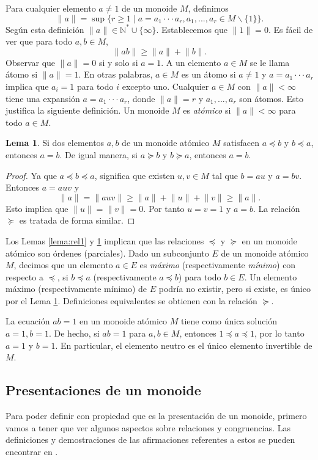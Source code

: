 \documentclass[12pt]{book}
\theoremstyle{definition}
\newtheorem{lema}{Lema}[section]
\providecommand{\norm}[1]{\lVert#1\rVert}
\begin{document}
Para cualquier elemento $a\neq 1$ de un monoide $M$, definimos
$$\norm{a}=\sup\{r\geq 1\mid a=a_1\cdot\cdot\cdot a_r,a_1,...,a_r\in M\backslash \{1\}\}.$$
Según esta definición $\norm{a}\in \mathbb{N}^*\cup\{\infty\}$. Establecemos que $\norm{1}=0$. Es fácil de ver que para todo $a,b\in M$,
$$\norm{ab}\geq\norm{a}+\norm{b}.$$
Observar que $\norm{a}=0$ si y solo si $a=1$. A un elemento $a\in M$ se le llama átomo si $\norm{a}=1$. En otras palabras, $a\in M$ es un átomo si $a\neq 1$ y $a=a_1\cdot\cdot\cdot a_r$ implica que $a_i=1$ para todo $i$ excepto uno. Cualquier $a\in M$ con $\norm{a} < \infty$ tiene una expansión $a=a_1\cdot\cdot\cdot a_r$, donde $\norm{a}=r$ y $a_1,...,a_r$ son átomos. Esto justifica la siguiente definición. Un monoide $M$ es \textit{atómico} si $\norm{a} < \infty$ para todo $a\in M$.

\begin{lema}
Si dos elementos $a,b$ de un monoide atómico $M$ satisfacen $a\preceq b$ y $b\preceq a$, entonces $a=b$. De igual manera, si $a\succeq b$ y $b\succeq a$, entonces $a=b$.
\label{lema:rel2}
\end{lema}

\begin{proof} Ya que $a\preceq b\preceq a$, significa que existen $u,v\in M$ tal que $b=au$ y $a=bv$. Entonces $a=auv$ y
$$\norm{a}=\norm{auv}\geq \norm{a}+\norm{u}+\norm{v}\geq \norm{a}.$$
Esto implica que $\norm{u}=\norm{v}=0$. Por tanto $u=v=1$ y $a=b$. La relación $\succeq$ es tratada de forma similar.
\end{proof}
Los Lemas \ref{lema:rel1} y \ref{lema:rel2} implican que las relaciones $\preceq$ y $\succeq$ en un monoide atómico son órdenes (parciales). Dado un subconjunto $E$ de un monoide atómico $M$, decimos que un elemento $a\in E$ es \textit{máximo} (respectivamente \textit{mínimo}) con respecto a $\preceq$, si $b\preceq a$ (respectivamente $a\preceq b$) para todo $b\in E$. Un elemento máximo (respectivamente mínimo) de $E$ podría no existir, pero si existe, es único por el Lema \ref{lema:rel2}. Definiciones equivalentes se obtienen con la relación $\succeq$.

La ecuación $ab=1$ en un monoide atómico $M$ tiene como única solución $a=1,b=1$. De hecho, si $ab=1$ para $a,b\in M$, entonces $1\preceq a \preceq 1$, por lo tanto $a=1$ y $b=1$. En particular, el elemento neutro es el único elemento invertible de $M$.

\subsection{Presentaciones de un monoide}
\label{subsec:rel}
Para poder definir con propiedad que es la presentación de un monoide, primero vamos a tener que ver algunos aspectos sobre relaciones y congruencias. Las definiciones y demostraciones de las afirmaciones referentes a estos se pueden encontrar en \cite{monoides}.
\end{document}
